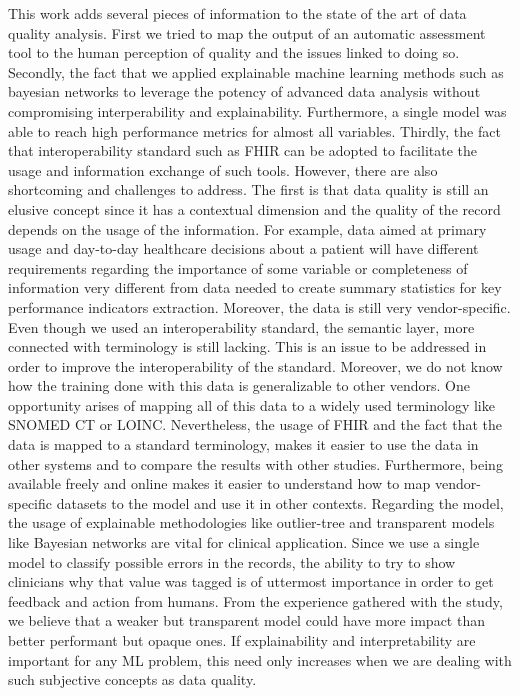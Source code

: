 This work adds several pieces of information to the state of the art of data quality analysis. First we tried to map the output of an automatic assessment tool to the human perception of quality and the issues linked to doing so. Secondly, the fact that we applied explainable machine learning methods such as bayesian networks to leverage the potency of advanced data analysis without compromising interperability and explainability. Furthermore, a single model was able to reach high performance metrics for almost all variables. Thirdly, the fact that interoperability standard such as FHIR can be adopted to facilitate the usage and information exchange of such tools. However, there are also shortcoming and challenges to address. The first is that data quality is still an elusive concept since it has a contextual dimension and the quality of the record depends on the usage of the information. For example, data aimed at primary usage and day-to-day healthcare decisions about a patient will have different requirements regarding the importance of some variable or completeness of information very different from data needed to create summary statistics for key performance indicators extraction. Moreover, the data is still very vendor-specific. Even though we used an interoperability standard, the semantic layer, more connected with terminology is still lacking. This is an issue to be addressed in order to improve the interoperability of the standard. Moreover, we do not know how the training done with this data is generalizable to other vendors. One opportunity arises of mapping all of this data to a widely used terminology like SNOMED CT or LOINC. Nevertheless, the usage of FHIR and the fact that the data is mapped to a standard terminology, makes it easier to use the data in other systems and to compare the results with other studies. Furthermore, being available freely and online makes it easier to understand how to map vendor-specific datasets to the model and use it in other contexts. Regarding the model, the usage of explainable methodologies like outlier-tree and transparent models like Bayesian networks are vital for clinical application. Since we use a single model to classify possible errors in the records, the ability to try to show clinicians why that value was tagged is of uttermost importance in order to get feedback and action from humans. From the experience gathered with the study, we believe that a weaker but transparent model could have more impact than better performant but opaque ones. If explainability and interpretability are important for any ML problem, this need only increases when we are dealing with such subjective concepts as data quality.

